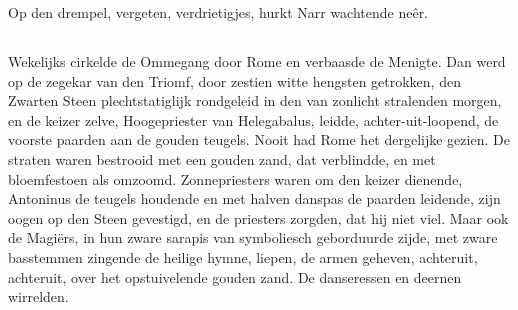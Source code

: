 \documentclass[a4paper, 12pt, oneside, dutch]{article}
\begin{document}
Op den drempel, vergeten, verdrietigjes, hurkt Narr wachtende neêr.

\subsection{}
\paragraph{}
Wekelijks cirkelde de Ommegang door Rome en verbaasde de Menigte. Dan werd op de zegekar van den Triomf, door zestien witte hengsten getrokken, den Zwarten Steen plechtstatiglijk rondgeleid in den van zonlicht stralenden morgen, en de keizer zelve, Hoogepriester van Helegabalus, leidde, achter-uit-loopend, de voorste paarden aan de gouden teugels. Nooit had Rome het dergelijke gezien. De straten waren bestrooid met een gouden zand, dat verblindde, en met bloemfestoen als omzoomd. Zonnepriesters waren om den keizer dienende, Antoninus de teugels houdende en met halven danspas de paarden leidende, zijn oogen op den Steen gevestigd, en de priesters zorgden, dat hij niet viel. Maar ook de Magiërs, in hun zware sarapis van symboliesch geborduurde zijde, met zware basstemmen zingende de heilige hymne, liepen, de armen geheven, achteruit, achteruit, over het opstuivelende gouden zand. De danseressen en deernen wirrelden.
\end{document}
